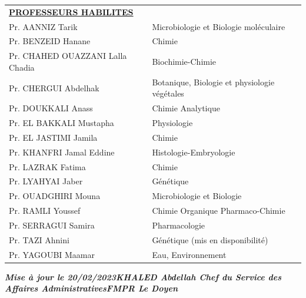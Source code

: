 \begin{table}[H]
  \begin{tabular}{l l}
    \multicolumn{2}{l}{\textbf{\underline{PROFESSEURS HABILITES}}}\vspace*{0.5em}\\
    Pr. AANNIZ Tarik & Microbiologie et Biologie moléculaire \\
    Pr. BENZEID Hanane & Chimie \\
    Pr. CHAHED OUAZZANI Lalla Chadia & Biochimie-Chimie \\
    Pr. CHERGUI Abdelhak & Botanique, Biologie et physiologie végétales \\
    Pr. DOUKKALI Anass & Chimie Analytique \\
    Pr. EL BAKKALI Mustapha & Physiologie \\
    Pr. EL JASTIMI Jamila & Chimie \\
    Pr. KHANFRI Jamal Eddine & Histologie-Embryologie \\
    Pr. LAZRAK Fatima & Chimie \\
    Pr. LYAHYAI Jaber & Génétique \\
    Pr. OUADGHIRI Mouna & Microbiologie et Biologie \\
    Pr. RAMLI Youssef & Chimie Organique Pharmaco-Chimie \\
    Pr. SERRAGUI Samira & Pharmacologie \\
    Pr. TAZI Ahnini & Génétique (mis en disponibilité) \\
    Pr. YAGOUBI Maamar & Eau, Environnement \\
  \end{tabular}
\end{table}


\begin{center}
  \textbf{\emph{Mise à jour le 20/02/2023KHALED Abdellah Chef du Service des Affaires AdministrativesFMPR Le Doyen}}
\end{center}





